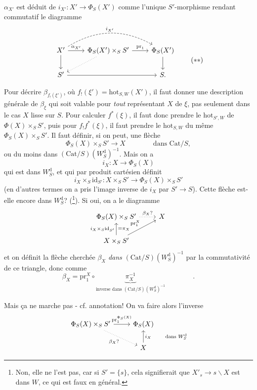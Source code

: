 \documentclass[11pt]{article}
\newcommand{\printedpage}[1]{\marginpar{\footnotesize p.~#1}}
\newcommand{\msp}[1]{\marginpar{\footnotesize [#1]}}
\newcommand{\Cat}{\mathrm{Cat}}
\newcommand{\id}{\mathrm{id}}
\newcommand{\hot}{\mathrm{hot}}
\newcommand{\pr}{\mathrm{pr}}
\newcommand{\Wd}{W^{\mathrm{d}}}
\begin{document}
$\alpha_{X'}$ est déduit de $i_{X'} : X'\longrightarrow\Phi_S(X')$ comme l'unique $S'$-morphisme rendant commutatif le diagramme
\[
\begin{tikzcd}
X' \arrow[r, "{\alpha_{X'}}"] \arrow[d] \arrow[rr, bend left, dashed, "{i_{X'}}"] & \Phi_S(X')\times_S S' \arrow[r, "\pr_1"] \arrow[dl, dotted] & \Phi_S(X') \arrow[d] \\ %
S' \arrow[rr] & & S.
\end{tikzcd}
\tag*{$(**)$}
\]

Pour décrire $\beta_{f_!(\xi')}$, où $f_!(\xi') = \hot_{S,W}(X')$, il faut donner une description générale de $\beta_\xi$ qui soit valable pour \textit{tout} représentant $X$ de $\xi$, pas seulement dans le cas $X$ lisse sur $S$. Pour calculer $f^*(\xi)$, il faut donc prendre le $\hot_{S',W}$ de $\Phi(X)\times_S S'$, puis pour $f_!f^*(\xi)$, il \msp{page 142}faut prendre le $\hot_{S,W}$ du même $\Phi_S(X)\times_S S'$. Il faut définir, si on peut, une flèche
\[
\Phi_S(X)\times_S S' \longrightarrow X \qquad\qquad \text{dans } \Cat/S,
\]
ou du moins dans $(\Cat/S)(\Wd_S)^{-1}$. Mais on a
\[
i_X : X \longrightarrow \Phi_S(X)
\]
qui est dans $\Wd_S$, et qui par produit cartésien définit
\[
i_X\times_S\id_{S'} : X\times_S S' \longrightarrow \Phi_S(X)\times_S S'
\]
(en d'autres termes on a pris l'image inverse de $i_X$ par $S'\longrightarrow S$). Cette flèche est-elle encore dans $\Wd_S$? (\footnote[69]{Non, elle ne l'est pas, car si $S'=\{s\}$, cela signifierait que $X'_s\longrightarrow s\backslash X$ est dans $W$, ce qui est faux en général.}). Si oui, on a le diagramme
\printedpage{87}
\[
\begin{tikzcd}
\Phi_S(X)\times_S S' \arrow[r, dotted, "\beta_X ?"] & X \\
X\times_S S' \arrow[u, "{i_X\times_S\id_{S'}}", "{=\pi_X}"'] \arrow[ur, "\pr_1^X"] &
\end{tikzcd}
\]
et on définit la flèche cherchée $\beta_X$ \textit{dans} $(\Cat/S)(\Wd_S)^{-1}$ par la commutativité de ce triangle, donc comme
\[
\beta_X = \pr_1^X\circ\underbrace{\pi_X^{-1}}_{\text{inverse dans }(\Cat/S)(\Wd_S)^{-1}} \qquad\qquad .
\]

\leavevmode\msp{page 143}Mais ça ne marche pas - cf. annotation! On va faire alors l'inverse
\[
\begin{tikzcd}
\Phi_S(X)\times_S S' \arrow[r, "\pr_1^{\Phi_S(X)}"] \arrow[dr, dotted, "\beta_X ?"'] & \Phi_S(X) \\
 & X \arrow[u, "{i_X \qquad \text{dans } \Wd_S}"']
\end{tikzcd}
\]
\end{document}
